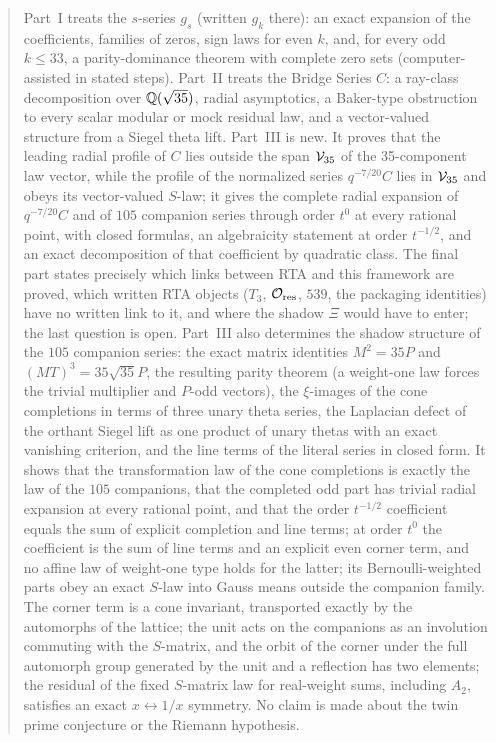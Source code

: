 \begin{abstract}
Part~I treats the $s$-series $g_s$ (written $g_k$ there): an exact expansion of the coefficients, families of zeros, sign laws for even $k$,
and, for every odd $k\le33$, a parity-dominance theorem with complete zero sets (computer-assisted in stated steps). Part~II treats the Bridge
Series $C$: a ray-class decomposition over $\Q(\sqrt{35})$, radial asymptotics, a Baker-type obstruction to every scalar modular or mock residual law,
and a vector-valued structure from a Siegel theta lift. Part~III is new. It proves that the leading radial profile of $C$ lies outside the span
$\VV$ of the 35-component law vector, while the profile of the normalized series $q^{-7/20}C$ lies in $\VV$ and obeys its vector-valued
$S$-law; it gives the complete radial expansion of $q^{-7/20}C$ and of $105$ companion series through order $t^0$ at every rational point,
with closed formulas, an algebraicity statement at order $t^{-1/2}$, and an exact decomposition of that coefficient by quadratic class.
The final part states precisely which links between RTA and this framework are proved, which written RTA objects ($T_3$, $\mathcal O_{\rm res}$,
$539$, the packaging identities) have no written link to it, and where the shadow $\Xi$ would have to enter; the last question is open.
Part~III also determines the shadow structure of the $105$ companion series: the exact matrix identities $M^2=35P$ and $(MT)^3=35\sqrt{35}P$, the resulting parity
theorem (a weight-one law forces the trivial multiplier and $P$-odd vectors), the $\xi$-images of the cone completions in terms of three unary theta series, the Laplacian
defect of the orthant Siegel lift as one product of unary thetas with an exact vanishing criterion, and the line terms of the literal series in closed form. It shows that the transformation law of the cone completions is exactly the law of the $105$ companions, that the completed odd part has trivial radial expansion at every rational point, and that the order $t^{-1/2}$ coefficient equals the sum of explicit completion and line terms; at order $t^0$ the coefficient is the sum of line terms and an explicit even corner term, and no affine law of weight-one type holds for the latter; its Bernoulli-weighted parts obey an exact $S$-law into Gauss means outside the companion family. The corner term is a cone invariant, transported exactly by the automorphs of the lattice; the unit acts on the companions as an involution commuting with the $S$-matrix, and the orbit of the corner under the full automorph group generated by the unit and a reflection has two elements; the residual of the fixed $S$-matrix law for real-weight sums, including $A_2$, satisfies an exact $x\leftrightarrow1/x$ symmetry.
No claim is made about the twin prime conjecture or the Riemann hypothesis.
\end{abstract}
\tableofcontents
\clearpage


